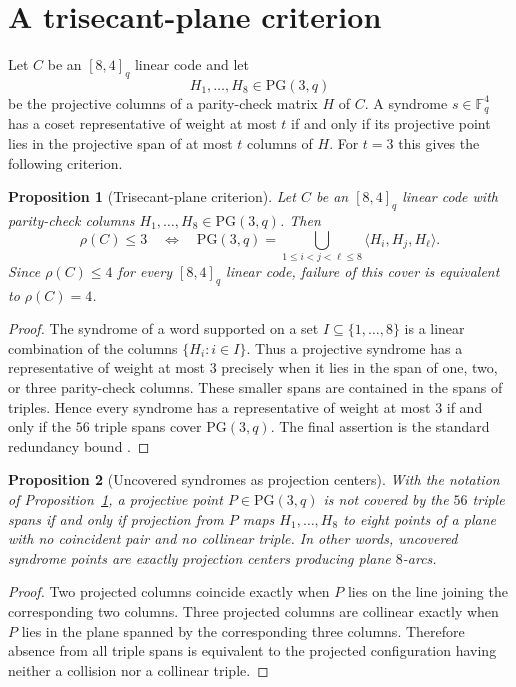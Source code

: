\documentclass[11pt]{article}
\newcommand{\F}{\mathbb F}
\newcommand{\PG}{\mathrm{PG}}
\theoremstyle{plain}
\newtheorem{proposition}{Proposition}
\theoremstyle{definition}
\begin{document}
\section{A trisecant-plane criterion}

Let \(C\) be an \([8,4]_q\) linear code and let
\[
  H_1,\ldots,H_8\in \PG(3,q)
\]
be the projective columns of a parity-check matrix \(H\) of \(C\).  A
syndrome \(s\in\F_q^4\) has a coset representative of weight at most \(t\) if
and only if its projective point lies in the projective span of at most \(t\)
columns of \(H\).  For \(t=3\) this gives the following criterion.

\begin{proposition}[Trisecant-plane criterion]\label{prop:criterion}
Let \(C\) be an \([8,4]_q\) linear code with parity-check columns
\(H_1,\ldots,H_8\in\PG(3,q)\).  Then
\[
  \rho(C)\le 3
  \quad\Longleftrightarrow\quad
  \PG(3,q)=
  \bigcup_{1\le i<j<\ell\le 8}
  \langle H_i,H_j,H_\ell\rangle .
\]
Since \(\rho(C)\le 4\) for every \([8,4]_q\) linear code, failure of this
cover is equivalent to \(\rho(C)=4\).
\end{proposition}

\begin{proof}
The syndrome of a word supported on a set \(I\subseteq\{1,\ldots,8\}\) is a
linear combination of the columns \(\{H_i:i\in I\}\).  Thus a projective
syndrome has a representative of weight at most \(3\) precisely when it lies
in the span of one, two, or three parity-check columns.  These smaller spans
are contained in the spans of triples.  Hence every syndrome has a
representative of weight at most \(3\) if and only if the \(56\) triple spans
cover \(\PG(3,q)\).  The final assertion is the standard redundancy bound
\cite{Cohen1997,Huffman2003}.
\end{proof}

\begin{proposition}[Uncovered syndromes as projection centers]\label{prop:projection}
With the notation of Proposition~\ref{prop:criterion}, a projective point
\(P\in\PG(3,q)\) is not covered by the \(56\) triple spans if and only if
projection from \(P\) maps \(H_1,\ldots,H_8\) to eight points of a plane with
no coincident pair and no collinear triple.  In other words, uncovered
syndrome points are exactly projection centers producing plane \(8\)-arcs.
\end{proposition}

\begin{proof}
Two projected columns coincide exactly when \(P\) lies on the line joining the
corresponding two columns.  Three projected columns are collinear exactly when
\(P\) lies in the plane spanned by the corresponding three columns.  Therefore
absence from all triple spans is equivalent to the projected configuration
having neither a collision nor a collinear triple.
\end{proof}
\end{document}
